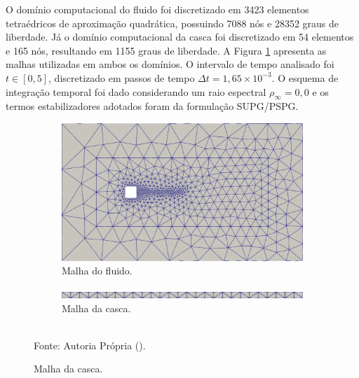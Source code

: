 
O domínio computacional do fluido foi discretizado em 3423 elementos tetraédricos de aproximação quadrática, possuindo 7088 nós e 28352 graus de liberdade. Já o domínio computacional da casca foi discretizado em 54 elementos e 165 nós, resultando em 1155 graus de liberdade. A Figura \ref{fig:meshPanel} apresenta as malhas utilizadas em ambos os domínios. O intervalo de tempo analisado foi $t\in[0,5]$, discretizado em passos de tempo $\Delta t=1,65\times10^{-3}$. O esquema de integração temporal foi dado considerando um raio espectral $\rho_\infty=0,0$ e os termos estabilizadores adotados foram da formulação SUPG/PSPG.

\begin{figure}[h!]
    \centering
    \caption{\textit{Flutter} em painel - Malha utilizada para os domínios da simulação de painel.}
    \begin{subfigure}[b]{\textwidth}
        \centering
        \includegraphics[width=.8\linewidth]{Figuras/FSI-prism/meshFluid.png}
        \caption{Malha do fluido.}
    \end{subfigure}
    \begin{subfigure}[b]{\textwidth}
        \centering
        \includegraphics[width=.8\linewidth]{Figuras/FSI-prism/meshSolid.png}
        \caption{Malha da casca.}
    \end{subfigure}
    \\Fonte: Autoria Própria (\the\year).
    \label{fig:meshPanel}
\end{figure}

